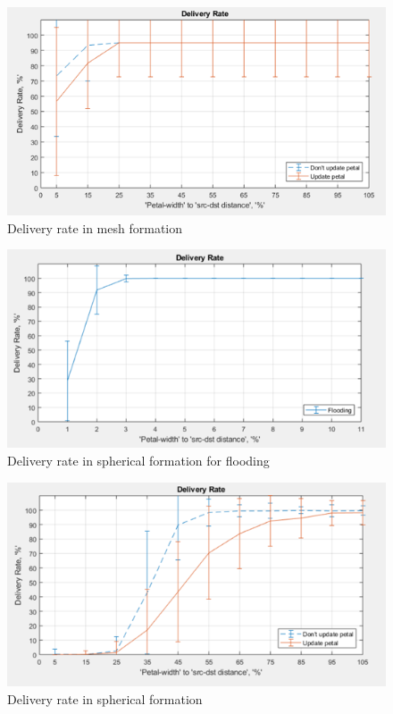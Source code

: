 \begin{figure}[hbtp]
\centering
\includegraphics[width=1\textwidth]{ncsuthesis-0.6/Chapter-5/figs/pe_DR_mesh.png}
\caption{Delivery rate in mesh formation}
\label{fig:pe_DR_mesh}
\end{figure}

\begin{figure}[hbtp]
\centering
\includegraphics[width=1\textwidth]{ncsuthesis-0.6/Chapter-5/figs/fl_DR_spherical.png}
\caption{Delivery rate in spherical formation for flooding}
\label{fig:fl_DR_spherical}
\end{figure}

\begin{figure}[hbtp]
\centering
\includegraphics[width=1\textwidth]{ncsuthesis-0.6/Chapter-5/figs/pe_DR_spherical.png}
\caption{Delivery rate in spherical formation}
\label{fig:pe_DR_spherical}
\end{figure}

